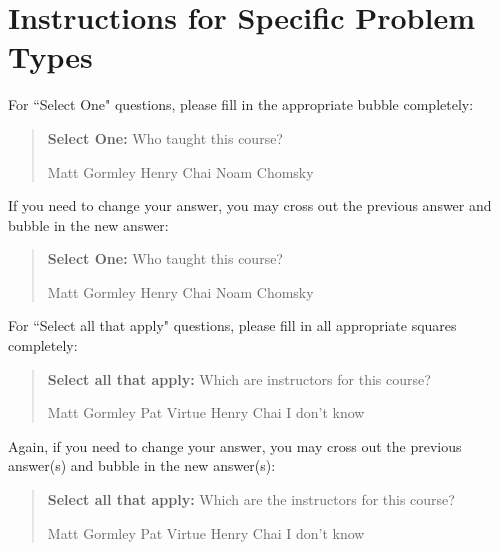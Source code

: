 \documentclass[11pt,addpoints,answers]{exam}
\newcommand{\blackcircle}{\tikz\draw[black,fill=black] (0,0) circle (1ex);}
\begin{document}
\newpage
\section*{Instructions for Specific Problem Types}

For ``Select One" questions, please fill in the appropriate bubble completely:

\begin{quote}
\textbf{Select One:} Who taught this course?
    \begin{checkboxes}
     \CorrectChoice Matt Gormley
     \choice Henry Chai
     \choice Noam Chomsky
    \end{checkboxes}
\end{quote}

If you need to change your answer, you may cross out the previous answer and bubble in the new answer:

\begin{quote}
\textbf{Select One:} Who taught this course?
    {
    \begin{checkboxes}
     \CorrectChoice Matt Gormley
     \choice Henry Chai \checkboxchar{\xcancel{\blackcircle}{}}
     \choice Noam Chomsky
    \end{checkboxes}
    }
\end{quote}

For ``Select all that apply" questions, please fill in all appropriate squares completely:

\begin{quote}
\textbf{Select all that apply:} Which are instructors for this course?
    {%
    \checkboxchar{$\Box$} \checkedchar{$\blacksquare$} %
    \begin{checkboxes}
    \CorrectChoice Matt Gormley  
    \CorrectChoice Pat Virtue
    \choice Henry Chai
    \choice I don't know
    \end{checkboxes}
    }
\end{quote}

Again, if you need to change your answer, you may cross out the previous answer(s) and bubble in the new answer(s):

\begin{quote}
\textbf{Select all that apply:} Which are the instructors for this course?
    {%
    \checkboxchar{\xcancel{$\blacksquare$}} \checkedchar{$\blacksquare$} %
    \begin{checkboxes}
    \CorrectChoice Matt Gormley 
    \CorrectChoice Pat Virtue
    \choice Henry Chai
    \choice I don't know
    \end{checkboxes}
    }
\end{quote}
\end{document}
